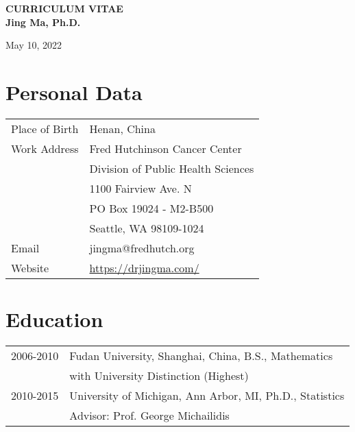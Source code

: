 \documentclass[10pt]{article}
\begin{document}
 

\begin{center}
{\large\bf 
CURRICULUM VITAE\\
Jing Ma, Ph.D.\\
}

May 10, 2022 

\vspace{1em}

\end{center} 

\section{Personal Data}

\begin{table}[H]
\hskip0.4cm\begin{tabular}{p{2cm}p{12.5cm}}
Place of Birth & Henan, China                           \\
{Work Address}   & Fred Hutchinson Cancer Center \\
& Division of Public Health Sciences\\
& 1100 Fairview Ave. N\\
& PO Box 19024 - M2-B500 \\
& Seattle, WA 98109-1024 \\
Email          & jingma@fredhutch.org \\
Website        & \url{https://drjingma.com/}                          
\end{tabular}
\end{table}


\section{Education}

\begin{table}[H]
\hskip0.9cm\begin{tabular}{p{1.6cm}p{12.5cm}}
2006-2010 & Fudan University, Shanghai, China, B.S., Mathematics \\
& with University Distinction (Highest)\\
2010-2015 & University of Michigan, Ann Arbor, MI, Ph.D., Statistics \\
& {Advisor}: Prof. George Michailidis
\end{tabular}
\end{table}
\end{document}
